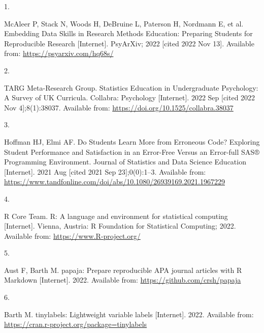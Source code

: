 \documentclass[
  man]{apa6}
\newlength{\cslhangindent}
\newlength{\csllabelwidth}
\newlength{\cslentryspacingunit} %
\newenvironment{CSLReferences}[2] %
 {%
  \setlength{\parindent}{0pt}
  \ifodd #1
  \let\oldpar\par
  \def\par{\hangindent=\cslhangindent\oldpar}
  \fi
  \setlength{\parskip}{#2\cslentryspacingunit}
 }%
 {}
\newcommand{\CSLLeftMargin}[1]{\parbox[t]{\csllabelwidth}{#1}}
\newcommand{\CSLRightInline}[1]{\parbox[t]{\linewidth - \csllabelwidth}{#1}\break}
\begin{document}
\hypertarget{refs}{}
\begin{CSLReferences}{0}{0}
\leavevmode{}%
\CSLLeftMargin{1. }%
\CSLRightInline{McAleer P, Stack N, Woods H, DeBruine L, Paterson H, Nordmann E, et al. Embedding {Data} {Skills} in {Research} {Methods} {Education}: {Preparing} {Students} for {Reproducible} {Research} {[}Internet{]}. PsyArXiv; 2022 {[}cited 2022 Nov 13{]}. Available from: \url{https://psyarxiv.com/hq68s/}}

\leavevmode{}%
\CSLLeftMargin{2. }%
\CSLRightInline{TARG Meta-Research Group. Statistics {Education} in {Undergraduate} {Psychology}: {A} {Survey} of {UK} {Curricula}. Collabra: Psychology {[}Internet{]}. 2022 Sep {[}cited 2022 Nov 4{]};8(1):38037. Available from: \url{https://doi.org/10.1525/collabra.38037}}

\leavevmode{}%
\CSLLeftMargin{3. }%
\CSLRightInline{Hoffman HJ, Elmi AF. Do {Students} {Learn} {More} from {Erroneous} {Code}? {Exploring} {Student} {Performance} and {Satisfaction} in an {Error}-{Free} {Versus} an {Error}-full {SAS}® {Programming} {Environment}. Journal of Statistics and Data Science Education {[}Internet{]}. 2021 Aug {[}cited 2021 Sep 23{]};0(0):1--3. Available from: \url{https://www.tandfonline.com/doi/abs/10.1080/26939169.2021.1967229}}

\leavevmode{}%
\CSLLeftMargin{4. }%
\CSLRightInline{R Core Team. R: A language and environment for statistical computing {[}Internet{]}. Vienna, Austria: R Foundation for Statistical Computing; 2022. Available from: \url{https://www.R-project.org/}}

\leavevmode{}%
\CSLLeftMargin{5. }%
\CSLRightInline{Aust F, Barth M. {papaja}: {Prepare} reproducible {APA} journal articles with {R Markdown} {[}Internet{]}. 2022. Available from: \url{https://github.com/crsh/papaja}}

\leavevmode{}%
\CSLLeftMargin{6. }%
\CSLRightInline{Barth M. {tinylabels}: Lightweight variable labels {[}Internet{]}. 2022. Available from: \url{https://cran.r-project.org/package=tinylabels}}

\end{CSLReferences}
\end{document}

